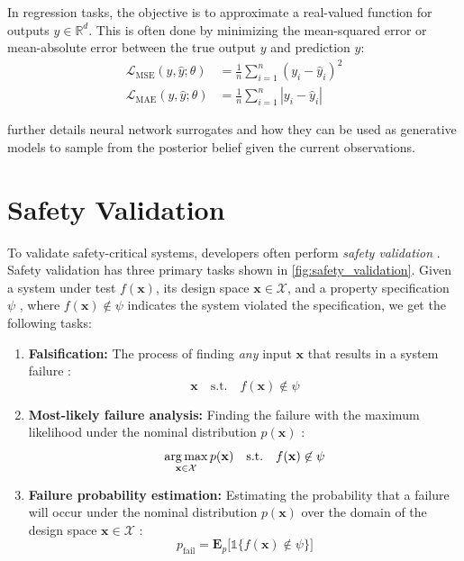 In regression tasks, the objective is to approximate a real-valued function for outputs $y \in \mathbb{R}^d$.
This is often done by minimizing the mean-squared error or mean-absolute error between the true output $y$ and prediction $\hat{y}$:
\begin{align}
    \mathcal{L}_\text{MSE}(y, \hat{y}; \theta) &= \frac{1}{n} \sum_{i=1}^n (y_i - \hat{y}_i)^2 \\
    \mathcal{L}_\text{MAE}(y, \hat{y}; \theta) &= \frac{1}{n} \sum_{i=1}^n |y_i - \hat{y}_i|
\end{align}

 further details neural network surrogates and how they can be used as generative models to sample from the posterior belief given the current observations.



\section{Safety Validation}\label{sec:safety_validation}

To validate safety-critical systems, developers often perform \textit{safety validation} \cite{corso2021survey}.
Safety validation has three primary tasks shown in \cref{fig:safety_validation}.
Given a system under test $f(\mathbf{x})$, its design space $\mathbf{x} \in \mathcal{X}$, and a property specification $\psi$ \cite{donze2010robust}, where $f(\mathbf{x}) \not\in \psi$ indicates the system violated the specification, we get the following tasks:
\begin{enumerate}
    \item \textbf{Falsification:} The process of finding \textit{any} input $\mathbf{x}$ that results in a system failure \cite{donze2010breach}:
    \begin{equation}
        \mathbf{x} \quad \text{s.t.} \quad f(\mathbf{x}) \not\in \psi
    \end{equation}
    \item \textbf{Most-likely failure analysis:} Finding the failure with the maximum likelihood under the nominal distribution $p(\mathbf{x})$ \cite{lee2020adaptive}:
    \begin{equation}
        \argmax_{\mathbf{x} \in \mathcal{X}} p(\mathbf{x}) \quad \text{s.t.} \quad f(\mathbf{x}) \not\in \psi
    \end{equation}
    \item \textbf{Failure probability estimation:} Estimating the probability that a failure will occur under the nominal distribution $p(\mathbf{x})$ over the domain of the design space $\mathbf{x} \in \mathcal{X}$ \cite{gooley1999estimation}:
    \begin{equation}
        p_\text{fail} = \mathbf{E}_p \big[ \mathds{1}\{f(\mathbf{x}) \not\in \psi \} \big]
    \end{equation}
\end{enumerate}

